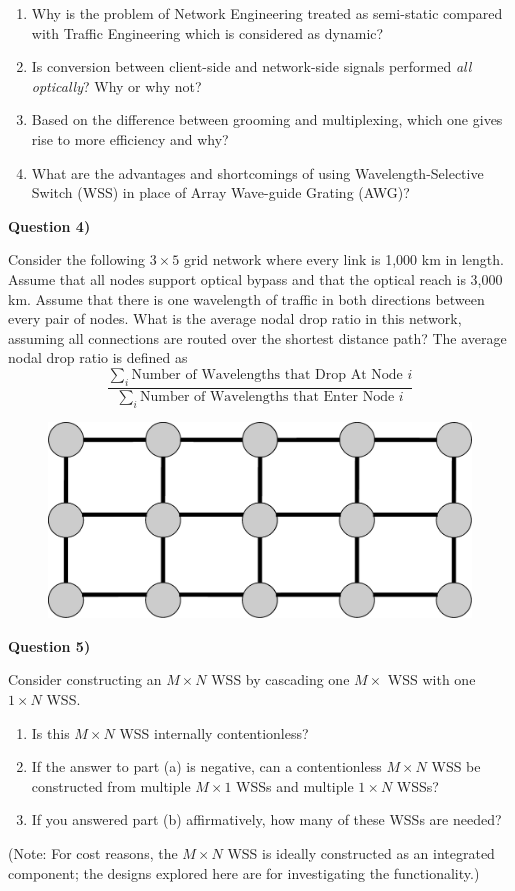 \documentclass[10pt,letterpaper]{article}
\newcommand{\Q}[1]{\textbf{Question #1)}}
\begin{document}
\begin{enumerate}[label=\alph*)]
\item
Why is the problem of Network Engineering treated as semi-static compared with Traffic Engineering which is considered as dynamic?
\item
Is conversion between client-side and network-side signals performed \textit{all optically}? Why or why not?
\item
Based on the difference between grooming and multiplexing, which one gives rise to more efficiency and why?
\item
What are the advantages and shortcomings of using Wavelength-Selective Switch (WSS) in place of Array Wave-guide Grating (AWG)?
\end{enumerate}

\Q4

Consider the following $3\times 5$ grid network where every link is 1,000 km in length. Assume that all nodes support optical bypass and that the optical reach is 3,000 km. Assume that there is one wavelength of traffic in both directions between every pair of nodes. What is the average nodal drop ratio in this network, assuming all connections are routed over the shortest distance path? The average nodal drop ratio is defined as
$$
\frac
{\sum_i\text{Number of Wavelengths that Drop At Node $i$}}
{\sum_i\text{Number of Wavelengths that Enter Node $i$}}
$$
\begin{figure}[ht]
\centering
\includegraphics[scale=0.2]{PS1_Simmons}
\end{figure}

\Q5

Consider constructing an $M\times N$ WSS by cascading one $M\times$ WSS with one $1\times N$ WSS.
\begin{enumerate}[label=\alph*)]
\item
Is this $M\times N$ WSS internally contentionless?
\item
If the answer to part (a) is negative, can a contentionless $M\times N$ WSS be constructed from multiple $M\times 1$ WSSs and multiple
$1\times N$ WSSs?
\item
If you answered part (b) affirmatively, how many of these WSSs are needed?
\end{enumerate}
(Note: For cost reasons, the $M\times N$ WSS is ideally constructed as an integrated component; the designs explored here are for investigating the functionality.)
\end{document}

